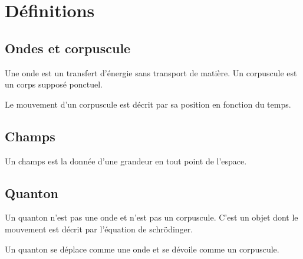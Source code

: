 
\chapter{Définitions}
%
\section{Ondes et corpuscule}
%
Une onde est un transfert d'énergie sans transport de matière. Un corpuscule est un corps supposé ponctuel.

Le mouvement d'un corpuscule est décrit par sa position en fonction du temps.
%
\section{Champs}

Un champs est la donnée d'une grandeur en tout point de l'espace.

\section{Quanton}
%
Un quanton n'est pas une onde et n'est pas un corpuscule. C'est un objet dont le mouvement est décrit par l'équation de schrödinger.

Un quanton se déplace comme une onde et se dévoile comme un corpuscule.


